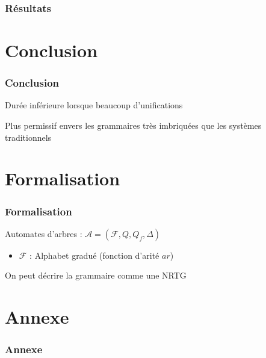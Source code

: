 \documentclass{beamer}
\begin{document}
\begin{frame}
		\frametitle{Résultats}
		\begin{center}
		\end{center}
\end{frame}


\section{Conclusion}
\begin{frame}
		\frametitle{Conclusion}
		\begin{tcolorbox}[title=Bénéfices]
				Durée inférieure lorsque beaucoup d'unifications
		\end{tcolorbox}
		\begin{tcolorbox}
				Plus permissif envers les grammaires très imbriquées que les systèmes traditionnels
		\end{tcolorbox}
\end{frame}

\section{Formalisation}
\begin{frame}
		\frametitle{Formalisation}
		Automates d'arbres : $\mathcal A  = (\mathcal F, Q, Q_f, \Delta)$\\
		\begin{itemize}
				\item{$\mathcal F$ : Alphabet gradué (fonction d'arité $ar$) }
		\end{itemize}
		On peut décrire la grammaire comme une NRTG
\end{frame}


\section{Annexe}
\begin{frame}[fragile]
		\frametitle{Annexe}
		\begin{lstlisting}
			
		\end{lstlisting}
\end{frame}
\end{document}
